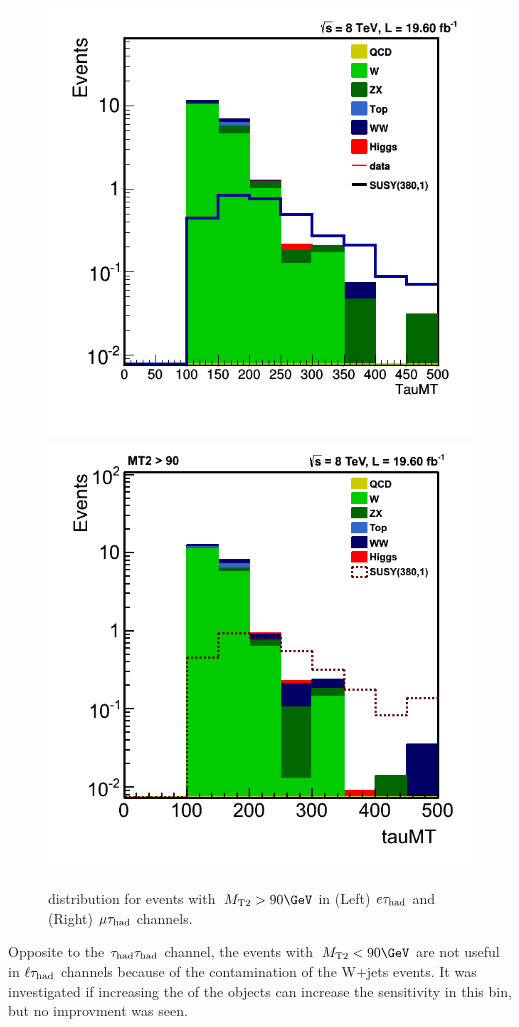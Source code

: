 \begin{figure}[htbp]
\centering
\includegraphics[angle=0,scale=0.35]{SelectionEleTau/TauMT.png}
\includegraphics[angle=0,scale=0.35]{SelectionMuTau/tauMT_MuTau.png}
\caption{\tauMT distribution for events with $\mttwo>90\GeV$ in (Left) $e\tau_{\rm had}$ and (Right) $\mu\tau_{\rm had}$ channels.}
\label{fig:taumtleptontau}
\end{figure}
Opposite to the $\tau_{\rm had}\tau_{\rm had}$ channel, the events with $\mttwo<90 \GeV$ are not useful in $\ell\tau_{\rm had}$ channels because of the contamination of 
the W+jets events. It was investigated if increasing the \pt of the objects can increase the sensitivity in this bin, but no improvment was seen.
